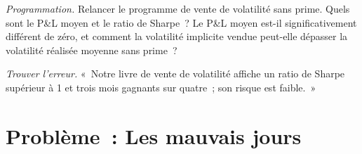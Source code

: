 \begin{exercise}[$\star\star\star$]\label{exo:dv:trading-volatility:7}
\emph{Programmation.} Relancer le programme de vente de volatilité sans prime. Quels sont le P\&L moyen et le ratio de Sharpe~? Le P\&L moyen est-il
significativement différent de zéro, et comment la volatilité implicite vendue peut-elle dépasser la volatilité réalisée moyenne sans prime~?
\end{exercise}

\begin{exercise}[$\star\star\star$]\label{exo:dv:trading-volatility:8}
\emph{Trouver l'erreur.} «~Notre livre de vente de volatilité affiche un ratio de Sharpe supérieur à 1 et trois mois gagnants sur quatre~; son risque est faible.~»
\end{exercise}

\section{Problème~: Les mauvais jours}

